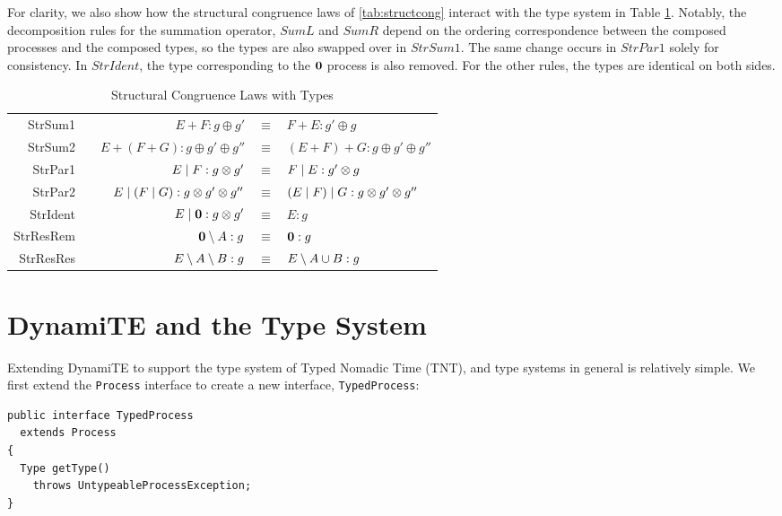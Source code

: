 For clarity, we also show how the structural congruence laws of
\ref{tab:structcong} interact with the type system in Table
\ref{tab:typedstructcong}.  Notably, the decomposition rules for the
summation operator, $SumL$ and $SumR$ depend on the ordering
correspondence between the composed processes and the composed types,
so the types are also swapped over in $StrSum1$.  The same change
occurs in $StrPar1$ solely for consistency.  In $StrIdent$, the type
corresponding to the $\textbf{0}$ process is also removed.  For the other
rules, the types are identical on both sides.

\begin{table}
 \caption{Structural Congruence Laws with Types}
 \label{tab:typedstructcong}
  \shrule \centering
  \begin{tabular}{rcrcl}
  StrSum1 & \quad\quad &  
  $E + F : g \oplus g'$              & $\equiv$ & $F + E : g' \oplus g$
\\
  StrSum2 &&  
  $E + (F + G) : g \oplus g' \oplus g''$        & $\equiv$ & $(E + F) + G : g \oplus g' \oplus g''$
\\
  StrPar1 &&  
  $E \;|\; F : g \otimes g'$            & $\equiv$ & $F \;|\; E : g' \otimes g$
\\
  StrPar2 &&  
  $E \;|\; (F \;|\; G) : g \otimes g' \otimes g''$    & $\equiv$ & $(E \;|\; F) \;|\; G : g \otimes g' \otimes g''$
\\
  StrIdent &&  
  $E \;|\; \textbf{0} : g \otimes g'$         & $\equiv$ & $E : g$
\\
  StrResRem &&  
  $\textbf{0} \setminus {A} : g$       & $\equiv$ & $\textbf{0} : g$
\\
  StrResRes &&  
  $E \setminus {A} \setminus {B} : g$  & $\equiv$ & $E \setminus {A \cup B} : g$
  \end{tabular}
  \shrule
\end{table}

\section{DynamiTE and the Type System}
\label{dyn:type}

Extending DynamiTE to support the type system of Typed Nomadic Time
(TNT), and type systems in general is relatively simple.  We first
extend the \texttt{Process} interface to create a new interface,
\texttt{TypedProcess}:

\begin{verbatim}
public interface TypedProcess
  extends Process
{
  Type getType()
    throws UntypeableProcessException;
}
\end{verbatim}

